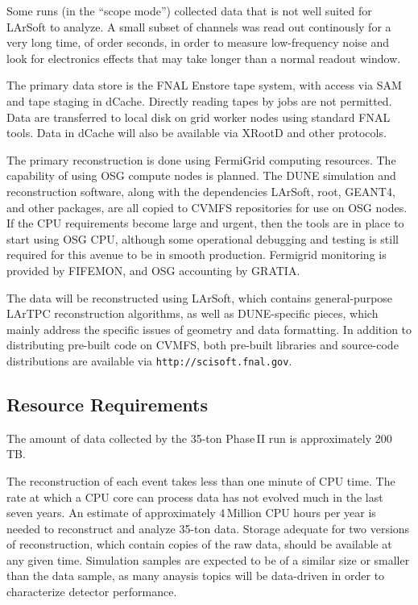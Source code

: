 Some runs (in the ``scope mode'') collected data that is not well suited for LArSoft to analyze.  A small subset
of channels was read out continously for a very long time, of order seconds, in order to measure
low-frequency noise and look for electronics effects that may take longer than a normal readout window.

The primary data store is the  FNAL Enstore tape system, with access via SAM and tape staging in
dCache.  Directly reading tapes by jobs are not permitted.  Data are transferred to local disk on grid
worker nodes using standard FNAL tools.  Data in dCache will also be available via XRootD and other protocols.

The primary reconstruction is done using FermiGrid computing resources.  The capability
of using OSG compute nodes is planned.  The DUNE simulation and reconstruction software, along with the
dependencies LArSoft, root, GEANT4, and other packages, are all copied to CVMFS repositories for use on
OSG nodes.  If the CPU requirements become large and urgent, then the tools are in place to start using
OSG CPU, although some operational debugging and testing is still required for this avenue to be in smooth
production.  Fermigrid monitoring is provided by FIFEMON, and OSG accounting by GRATIA.

The data will be reconstructed using LArSoft, which contains general-purpose LArTPC reconstruction algorithms,
as well as DUNE-specific pieces, which mainly address the specific issues of geometry and data formatting.
In addition to distributing pre-built code on CVMFS, both pre-built libraries and source-code distributions
are available via {\tt http://scisoft.fnal.gov}.


\subsection{Resource Requirements}
\label{sec:35t-resource-requirements}
The amount of data collected by the 35-ton Phase\,II run is approximately 200\,TB. 

The reconstruction of each event takes less than one minute of CPU time.  The rate at which
a CPU core can process data has not evolved much in the last seven years.  An estimate of approximately
4\,Million CPU hours per year is needed to reconstruct and analyze 35-ton data.  Storage adequate for
two versions of reconstruction, which contain copies of the raw data, should be available at any given time.
Simulation samples are expected to be of a similar size or smaller than the data sample, as many anaysis
topics will be data-driven in order to characterize detector performance.
